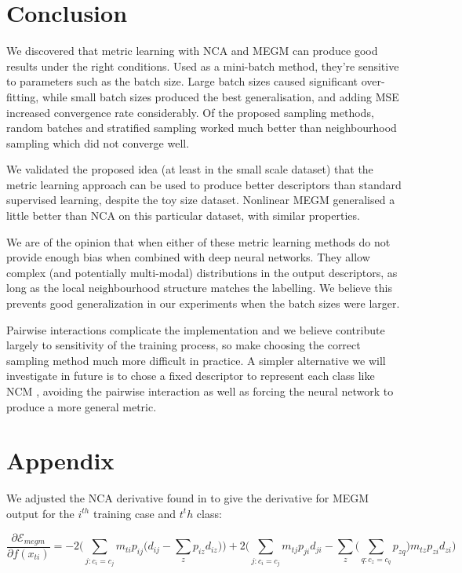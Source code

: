 \section {Conclusion}

We discovered that metric learning with \gls{NCA} and \gls{MEGM} can produce good results under the right conditions. Used as a mini-batch method, they're sensitive to parameters such as the batch size. Large batch sizes caused significant over-fitting,
while small batch sizes produced the best generalisation, and adding \gls{MSE} increased convergence rate considerably. Of the proposed sampling methods, random batches and stratified sampling worked much better than neighbourhood sampling which did not converge well.


We validated the proposed idea (at least in the small scale dataset) that
the metric learning approach can be used to produce better descriptors than
standard supervised learning, despite the toy size dataset. Nonlinear MEGM
generalised a little better than NCA on this particular dataset, with similar
properties.

We are of the opinion that when either of these metric learning methods do
not provide enough bias when combined with deep neural networks. They allow
complex (and potentially multi-modal) distributions in the output descriptors,
as long as the local neighbourhood structure matches the labelling. We believe
this prevents good generalization in our experiments when the batch sizes were
larger.

Pairwise interactions complicate the implementation and we believe contribute largely to sensitivity of the training process, so make choosing the correct
sampling method much more difficult in practice. A simpler alternative we will
investigate in future is to chose a fixed descriptor to represent each class like
\gls{NCM} \cite {Mensink2012a}, avoiding the pairwise interaction
as well as forcing the neural network to produce a more general metric.



\section{Appendix}
\label{sec:appendix}

 We adjusted the \gls{NCA} derivative found in \cite {Salakhutdinov2007a} to give the derivative for \gls{MEGM} output for the $ i^{th} $ training case and $ t^th $ class:


\begin{equation}
\label{eq:megm_grad}
\frac{\partial \mathcal{E}_{megm}}{\partial f(x_{ti})} = 
  -2 \bigg( \sum_{j:c_i = c_j}  m_{ti} {p_{ij} \Big( d_{ij} - \sum_z{p_{iz}d_{iz}} \Big) } \bigg) 
  +2 \bigg( \sum_{j:c_i = c_j} m_{tj}{p_{ji}d_{ji} - \sum_z{\Big( \sum_{q:c_z = c_q}{p_{zq}} \Big) m_{tz}p_{zi}d_{zi}   }} \bigg)
\end{equation}

